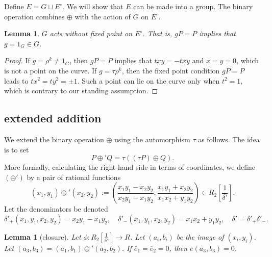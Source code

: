 \documentclass[12pt]{article}
\newtheorem{lemma}[theorem]{Lemma}
\newcommand{\f}[1]{\frac{1}{#1}}
\newcommand{\Eoo}{E^{\circ}}
\newcommand{\Go}{\langle\rho\rangle}
\begin{document}
Define $E = G\sqcup \Eoo$.  We will show that $E$ can be made into a
group.  The binary operation 
combines $\oplus$ with the action of $G$ on $\Eoo$.



\begin{lemma}  \label{lemma:no-fix}
  $G$ acts without fixed point on $\Eoo$.  That is, $g P = P$ implies
  that $g=1_G\in G$.
\end{lemma}

\begin{proof} 
  If $g = \rho^k\ne 1_G$, then $g P = P$ implies that $t x y
  = - t x y$ and $x=y=0$, which is not a point on the curve.  If $g =
  \tau \rho^k$, then the fixed point condition $g P = P$ leads to $t
  x^2 = t y^2 =\pm 1$.  Such a point can lie on the curve only
when $t^2=1$, which is contrary to our standing assumption.
\end{proof}

\subsection{extended addition}

We extend the binary operation $\oplus$ using the automorphism $\tau$
as follows.  The idea is to
set 
\begin{equation}\label{eqn:tauplus}
P\oplus' Q = \tau((\tau P)\oplus Q).
\end{equation}
More formally, calculating the right-hand side in terms of
coordinates, we define $(\oplus')$ by a pair of rational functions
\[
(x_1,y_1)\oplus' (x_2,y_2) := \left(\frac{x_1y_1 - x_2 y_2}{x_2
    y_1-x_1 y_2},\frac{x_1 y_1 + x_2 y_2}{x_1 x_2 + y_1 y_2}\right) 
    \in R_2[\f{\delta'}].
\]
Let the denominators be denoted
\[
\delta'_+(x_1,y_1,x_2,y_2) = x_2 y_1 - x_1 y_2,
\quad \delta'_-(x_1,y_1,x_2,y_2)= x_1 x_2 + y_1 y_2,
\quad \delta' = \delta'_+ \delta'_-.
\] 
\smallskip

\begin{lemma}[closure]
  Let $\phi:R_2[\f{\delta'}]\to R$.  Let $(a_i,b_i)$ be the image of
  $(x_i,y_i)$.  Let $(a_3,b_3)=(a_1,b_1)\oplus' (a_2,b_2)$.  If $\bar
  e_1 = \bar e_2 = 0$, then $e(a_3,b_3)=0$.
\end{lemma}
\end{document}
